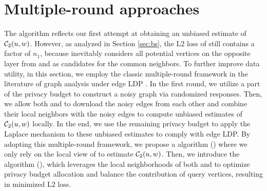 \section{Multiple-round approaches}
\label{sec:adv}


The \bs algorithm reflects our first attempt at obtaining an unbiased estimate of $\mathcal{C}_2(u,w)$. 
{However, as analyzed in Section \ref{sec:bs}, the L2 loss of \bs still contains a factor of $n_1$}, because \bs inevitably considers all potential vertices on the opposite layer from \vq and \vx as candidates for the common neighbors. 
To further improve data utility, in this section, we employ the classic multiple-round framework in the literature of graph analysis under edge LDP \cite{imola2021locally}. 
In the first round, we utilize a part of the privacy budget to construct a noisy graph via randomized responses. 
Then, we allow both \vq and \vx to download the noisy edges from each other and combine their local neighbors with the noisy edges to compute unbiased estimates of $\mathcal{C}_2(u,w)$ locally. 
In the end, we use the remaining privacy budget to apply the Laplace mechanism to these unbiased estimates to comply with edge LDP. 
By adopting this multiple-round framework, we propose a \advsslong algorithm (\advss) where we only rely on the local view of \vq to estimate $\mathcal{C}_2(u,w)$. 
Then, we introduce the \advdslong algorithm (\advds), which leverages the local neighborhoods of both \vq and \vx to optimize privacy budget allocation and balance the contribution of query vertices, resulting in minimized L2 loss.


